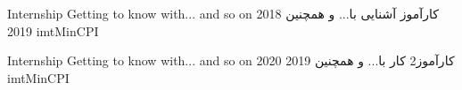 
\jobPositionC
{Internship}
{Getting to know with... and so on}
{کارآموز}
{آشنایی با... و همچنین}
{\parttime}
{2018}
{2019}
{imtMinCPI}

\jobPositionC
{Internship}
{Getting to know with... and so on}
{کارآموز2}
{کار با... و همچنین}
{\fulltime}
{2019}
{2020}
{imtMinCPI}
